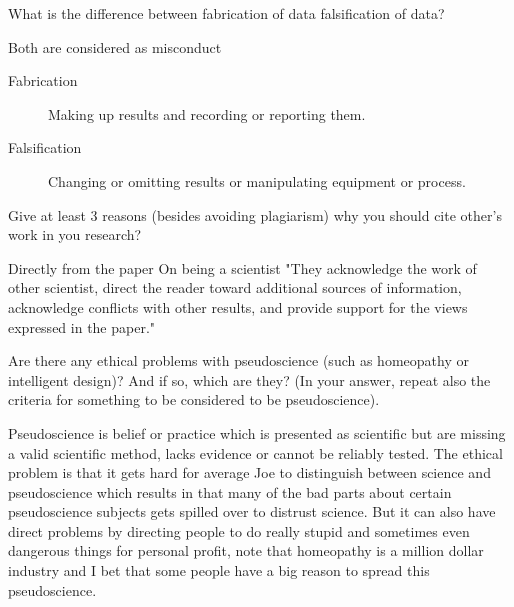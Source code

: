 \documentclass[a4paper,twoside=false,abstract=false,numbers=noenddot,
titlepage=false,headings=small,parskip=half,version=last]{scrartcl}
\begin{document}

\begin{exercise}{1}
    What is the difference between fabrication of data falsification of data?
\end{exercise}
\begin{solution} Both are considered as misconduct \\
    \begin{description}
       \item[Fabrication] Making up results and recording or reporting them. \\
       \item[Falsification] Changing or omitting results or manipulating
       equipment or process. \\
    \end{description}
\end{solution}
\begin{exercise}{2}
    Give at least 3 reasons (besides avoiding plagiarism) why you should cite
    other's work in you research?
\end{exercise}
\begin{solution}
    Directly from the paper On being a scientist "They acknowledge the work of
    other scientist, direct the reader toward additional sources of
    information, acknowledge conflicts with other results, and provide support
    for the views expressed in the paper."
\end{solution}
\begin{exercise}{3}
    Are there any ethical problems with pseudoscience (such as homeopathy or
    intelligent design)? And if so, which are they? (In your answer, repeat
    also the criteria for something to be considered to be pseudoscience).
\end{exercise}
\begin{solution}
    Pseudoscience is belief or practice which is presented as scientific but
    are missing a valid scientific method, lacks evidence or cannot be reliably
    tested. The ethical problem is that it gets hard for average Joe to
    distinguish between science and pseudoscience which results in that many of
    the bad parts about certain pseudoscience subjects gets spilled over to
    distrust science. But it can also have direct problems by directing people
    to do really stupid and sometimes even dangerous things for personal
    profit, note that homeopathy is a million dollar industry and I bet that
    some people have a big reason to spread this pseudoscience.
\end{solution}
\end{document}
